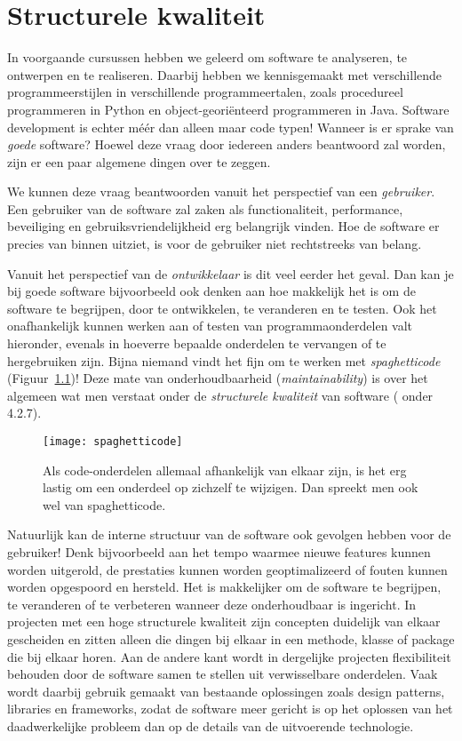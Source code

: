 \chapter{Structurele kwaliteit}
In voorgaande cursussen hebben we geleerd om software 
te analyseren, te ontwerpen en te realiseren.
Daarbij hebben we kennisgemaakt met verschillende
programmeerstijlen in verschillende programmeertalen, 
zoals procedureel programmeren in Python en 
object-georiënteerd programmeren in Java.
Software development is echter méér dan alleen maar code typen!
Wanneer is er sprake van \emph{goede} software?
Hoewel deze vraag door iedereen anders beantwoord zal
worden, zijn er een paar algemene dingen over te zeggen.

We kunnen deze vraag beantwoorden vanuit het perspectief 
van een \emph{gebruiker}. Een gebruiker van de software 
zal zaken als functionaliteit, performance, beveiliging 
en gebruiksvriendelijkheid erg belangrijk vinden. 
Hoe de software er precies van binnen uitziet,
is voor de gebruiker niet rechtstreeks van belang.

Vanuit het perspectief van de \emph{ontwikkelaar}
is dit veel eerder het geval.
Dan kan je bij goede software bijvoorbeeld ook denken 
aan hoe makkelijk het is om de software te begrijpen,
door te ontwikkelen, te veranderen en te testen. Ook het onafhankelijk
kunnen werken aan of testen van programmaonderdelen valt hieronder,
evenals in hoeverre bepaalde onderdelen te vervangen of te hergebruiken zijn.
Bijna niemand vindt het fijn om te werken 
met \emph{spaghetticode} (Figuur~\ref{fig:spaghetticode})!
Deze mate van onderhoudbaarheid (\emph{maintainability}) is over het algemeen
wat men verstaat onder de \emph{structurele kwaliteit} 
van software (\cite{ISO25010} onder 4.2.7).

\begin{figure}[H]
    \centering
    \texttt{[image: spaghetticode]}
    \caption{Als code-onderdelen allemaal afhankelijk van elkaar zijn, 
    is het erg lastig om een onderdeel op zichzelf te wijzigen. 
    Dan spreekt men ook wel van spaghetticode.}
    \label{fig:spaghetticode}
\end{figure}

Natuurlijk kan de interne structuur 
van de software ook gevolgen hebben voor de gebruiker!
Denk bijvoorbeeld aan het tempo waarmee nieuwe features
kunnen worden uitgerold, de prestaties kunnen worden geoptimalizeerd 
of fouten kunnen worden opgespoord en hersteld. 
Het is makkelijker om de software te begrijpen, te veranderen 
of te verbeteren wanneer deze onderhoudbaar is ingericht. 
In projecten met een hoge structurele kwaliteit
zijn concepten duidelijk van elkaar gescheiden en zitten alleen die dingen
bij elkaar in een methode, klasse of package die bij elkaar horen.
Aan de andere kant wordt in dergelijke projecten flexibiliteit behouden
door de software samen te stellen uit verwisselbare onderdelen.
Vaak wordt daarbij gebruik gemaakt van bestaande oplossingen
zoals design patterns, libraries en frameworks, zodat de 
software meer gericht is op het oplossen van het 
daadwerkelijke probleem dan op de details van de uitvoerende technologie.

